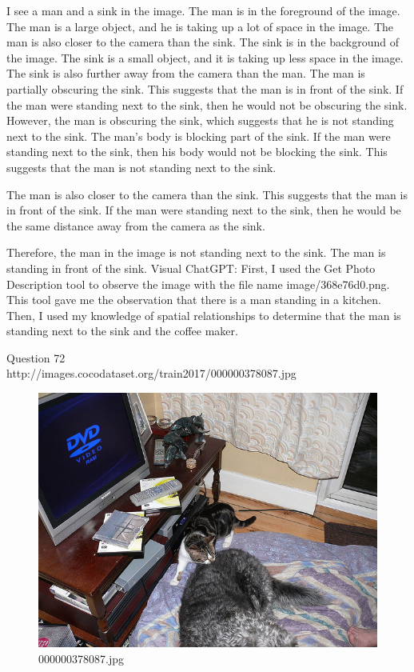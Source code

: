 \begin{enumerate}
    I see a man and a sink in the image.
    The man is in the foreground of the image. The man is a large object, and he is taking up a lot of space in the image. The man is also closer to the camera than the sink.
    The sink is in the background of the image. The sink is a small object, and it is taking up less space in the image. The sink is also further away from the camera than the man.
    The man is partially obscuring the sink. This suggests that the man is in front of the sink.
    If the man were standing next to the sink, then he would not be obscuring the sink. However, the man is obscuring the sink, which suggests that he is not standing next to the sink.
    The man's body is blocking part of the sink. If the man were standing next to the sink, then his body would not be blocking the sink. This suggests that the man is not standing next to the sink.
    
    The man is also closer to the camera than the sink. This suggests that the man is in front of the sink. If the man were standing next to the sink, then he would be the same distance away from the camera as the sink.
    
    Therefore, the man in the image is not standing next to the sink. The man is standing in front of the sink.
    \subitem Visual ChatGPT: First, I used the Get Photo Description tool to observe the image with the file name image/368e76d0.png. This tool gave me the observation that there is a man standing in a kitchen. Then, I used my knowledge of spatial relationships to determine that the man is standing next to the sink and the coffee maker.
\end{enumerate}
Question 72\\
http://images.cocodataset.org/train2017/000000378087.jpg
\begin{figure}[h]
    \centering
    \includegraphics[width=0.8\linewidth]{../image set/hard/000000378087.jpg}
    \caption{000000378087.jpg}
\end{figure}
